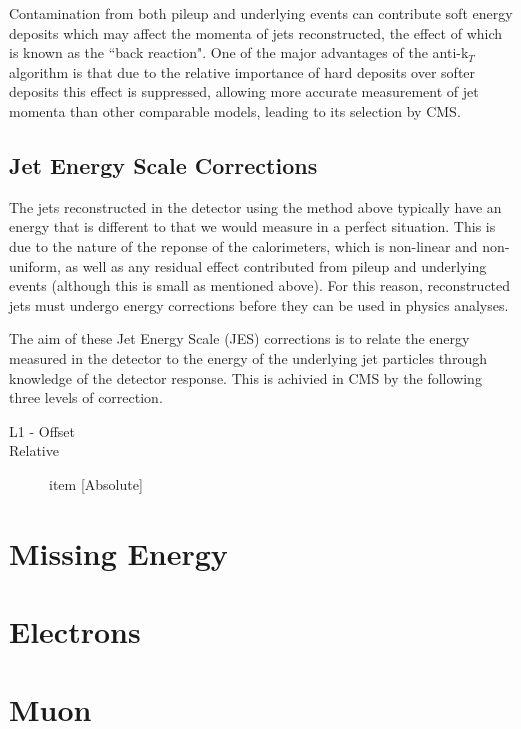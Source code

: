 Contamination from both pileup and underlying events can contribute soft energy deposits which may affect the momenta of jets reconstructed, the effect of which is known as the ``back reaction". One of the major advantages of the anti-k$_{T}$ algorithm is that due to the relative importance of hard deposits over softer deposits this effect is suppressed, allowing more accurate measurement of jet momenta than other comparable models, leading to its selection by CMS.
\subsection{Jet Energy Scale Corrections}

The jets reconstructed in the detector using the method above typically have an energy that is different to that we would measure in a perfect situation. This is due to the nature of the reponse of the calorimeters, which is non-linear and non-uniform, as well as any residual effect contributed from pileup and underlying events (although this is small as mentioned above). For this reason, reconstructed jets must undergo energy corrections before they can be used in physics analyses. 

The aim of these Jet Energy Scale (JES) corrections is to relate the energy measured in the detector to the energy of the underlying jet particles through knowledge of the detector response. This is achivied in CMS by the following three levels of correction.

\begin{description}
\item[L1 - Offset]{}
\item[Relative]{}
item [Absolute]{}
\end{description}
\section{Missing Energy}

\section{Electrons}

\section{Muon}
